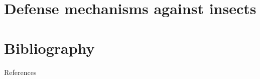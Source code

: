 \documentclass[11pt,dvipsnames,ignorenonframetext,aspectratio=169]{beamer}
\newif\ifbibliography
\begin{document}
\hypertarget{defense-mechanisms-against-insects}{%
\section{Defense mechanisms against
insects}\label{defense-mechanisms-against-insects}}

\hypertarget{bibliography}{%
\section{Bibliography}\label{bibliography}}

\begin{frame}{References}
\protect\hypertarget{references}{}
\end{frame}

          \begin{frame}[allowframebreaks]{}
    \bibliographytrue
    
    \end{frame}
  
\end{document}
